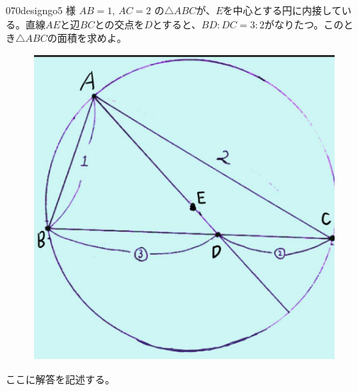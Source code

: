 \begin{thm}{070}{}{designgo5 様}
 $AB=1$, $AC=2$ の$\triangle{ABC}$が、$E$を中心とする円に内接している。直線$AE$と辺$BC$との交点を$D$とすると、$BD:DC=3:2$がなりたつ。このとき$\triangle{ABC}$の面積を求めよ。
 \begin{figure}[H]
  \centering
  \includegraphics[bb=0 0 922 934,width=0.7\linewidth]{../problems/Q_070/Q_070.jpg}
 \end{figure}
\end{thm}

ここに解答を記述する。
